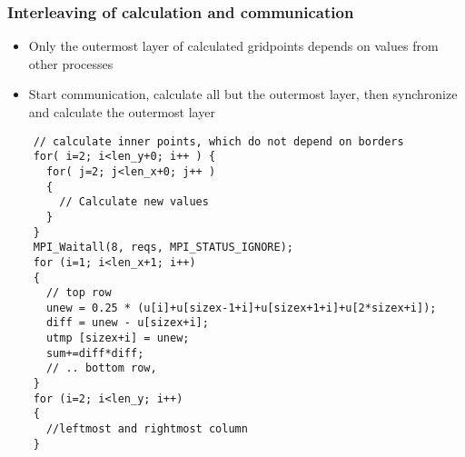 \begin{frame}
  \frametitle{Interleaving of calculation and communication}
    \begin{itemize}
    \item Only the outermost layer of calculated gridpoints depends on values from other processes
    \item Start communication, calculate all but the outermost layer, then synchronize and calculate the outermost layer
    \end{itemize}
\end{frame}

\begin{frame}[fragile]
  \begin{lstlisting}
    // calculate inner points, which do not depend on borders
    for( i=2; i<len_y+0; i++ ) {
      for( j=2; j<len_x+0; j++ )
      {
        // Calculate new values	
      }
    }
    MPI_Waitall(8, reqs, MPI_STATUS_IGNORE);
    for (i=1; i<len_x+1; i++)
    {
      // top row
      unew = 0.25 * (u[i]+u[sizex-1+i]+u[sizex+1+i]+u[2*sizex+i]);
      diff = unew - u[sizex+i];
      utmp [sizex+i] = unew;
      sum+=diff*diff;
      // .. bottom row,
    }
    for (i=2; i<len_y; i++)
    {
      //leftmost and rightmost column
    }
  \end{lstlisting}
\end{frame}
